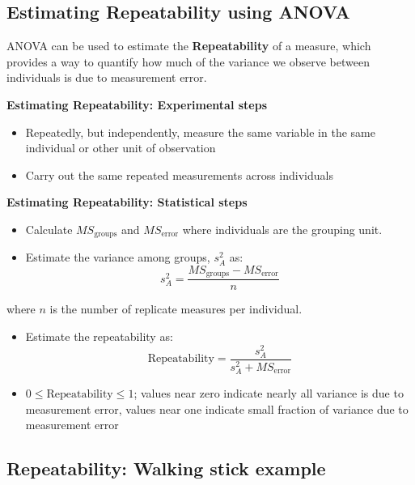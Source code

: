 \documentclass[]{book}
\providecommand{\tightlist}{%
  \setlength{\itemsep}{0pt}\setlength{\parskip}{0pt}}
\theoremstyle{definition}
\theoremstyle{definition}
\theoremstyle{definition}
\theoremstyle{remark}
\begin{document}
\hypertarget{estimating-repeatability-using-anova}{%
\subsection*{Estimating Repeatability using
ANOVA}\label{estimating-repeatability-using-anova}}

ANOVA can be used to estimate the \textbf{Repeatability} of a measure,
which provides a way to quantify how much of the variance we observe
between individuals is due to measurement error.

\textbf{Estimating Repeatability: Experimental steps}

\begin{itemize}
\tightlist
\item
  Repeatedly, but independently, measure the same variable in the same
  individual or other unit of observation
\item
  Carry out the same repeated measurements across individuals
\end{itemize}

\textbf{Estimating Repeatability: Statistical steps}

\begin{itemize}
\tightlist
\item
  Calculate \(MS_\text{groups}\) and \(MS_\text{error}\) where
  individuals are the grouping unit.
\item
  Estimate the variance among groups, \(s_A^2\) as: \[
  s_A^2 = \frac{MS_\text{groups} - MS_\text{error}}{n}
  \]
\end{itemize}

where \(n\) is the number of replicate measures per individual.

\begin{itemize}
\item
  Estimate the repeatability as: \[
  \text{Repeatability} = \frac{s_A^2}{s_A^2 + MS_\text{error}}
  \]
\item
  \(0 \leq \text{Repeatability} \leq 1\); values near zero indicate
  nearly all variance is due to measurement error, values near one
  indicate small fraction of variance due to measurement error
\end{itemize}

\hypertarget{repeatability-walking-stick-example}{%
\subsection*{Repeatability: Walking stick
example}\label{repeatability-walking-stick-example}}
\end{document}
